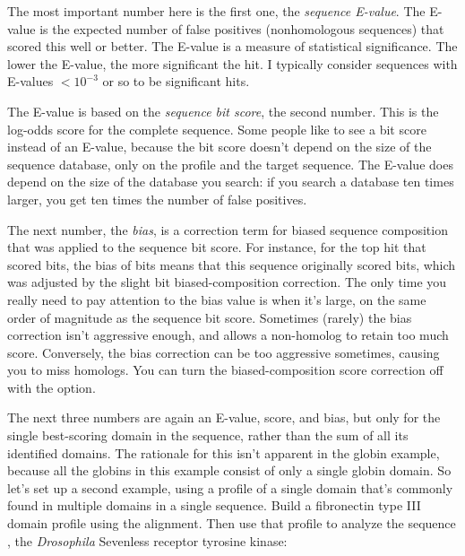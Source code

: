 The most important number here is the first one, the \emph{sequence
  E-value}. The E-value is the expected number of false positives
(nonhomologous sequences) that scored this well or better.  The
E-value is a measure of statistical significance. The lower the
E-value, the more significant the hit.  I typically consider
sequences with E-values $< 10^{-3}$ or so to be significant hits.

The E-value is based on the \emph{sequence bit score}, the second
number. This is the log-odds score for the complete sequence.  Some
people like to see a bit score instead of an E-value, because the bit
score doesn't depend on the size of the sequence database, only on the
profile and the target sequence. The E-value does depend on the
size of the database you search: if you search a database ten times
larger, you get ten times the number of false positives.

The next number, the \emph{bias}, is a correction term for biased
sequence composition that was applied to the sequence bit
score.
For instance, for the top hit \mono{\SGUseqname{}}
that scored \SGUbitscore{} bits, the bias of \SGUbias{} bits means
that this sequence originally scored \SGUorigscore{} bits, which was adjusted by
the slight \SGUbias{} bit biased-composition correction. The only time you
really need to pay attention to the bias value is when it's large, on
the same order of magnitude as the sequence bit score. Sometimes
(rarely) the bias correction isn't aggressive enough, and allows a
non-homolog to retain too much score. Conversely, the bias correction
can be too aggressive sometimes, causing you to miss homologs. You can
turn the biased-composition score correction off with the
 option.

The next three numbers are again an E-value, score, and bias, but only
for the single best-scoring domain in the sequence, rather than the
sum of all its identified domains. The rationale for this isn't
apparent in the globin example, because all the globins in this
example consist of only a single globin domain. So let's set up a
second example, using a profile of a single domain that's commonly
found in multiple domains in a single sequence. Build a fibronectin
type III domain profile using the 
alignment.
Then use that profile to analyze the sequence , the
\emph{Drosophila} Sevenless receptor tyrosine kinase:


